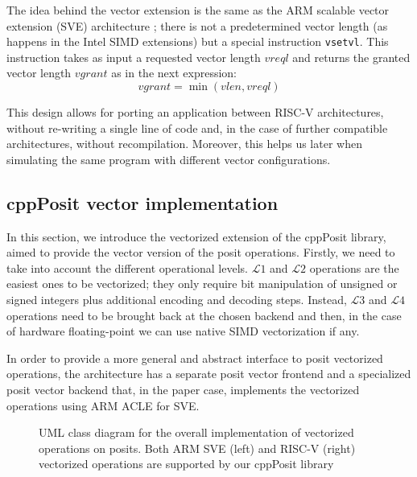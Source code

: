 The idea behind the vector extension is the same as the ARM scalable vector extension (SVE) architecture \cite{armintr}; there is not a predetermined vector length (as happens in the Intel SIMD extensions) but a special instruction \texttt{vsetvl}. This instruction takes as input a requested vector length $vreql$ and returns the granted vector length $vgrant$ as in the next expression:
\begin{equation*} %
    vgrant = \min\left(vlen,vreql\right)
\end{equation*}

This design allows for porting an application between RISC-V architectures, without re-writing a single line of code and, in the case of further compatible architectures, without recompilation. Moreover, this helps us later when simulating the same program with different vector configurations.

\subsection{cppPosit vector implementation}

In this section, we introduce the vectorized extension of the cppPosit library, aimed to provide the vector version of the posit operations. Firstly, we need to take into account the  different operational levels. $\mathcal{L}1$ and $\mathcal{L}2$ operations are the easiest ones to be vectorized; they only require bit manipulation of unsigned or signed integers plus additional encoding and decoding steps. Instead, $\mathcal{L}3$ and $\mathcal{L}4$ operations need to be brought back at the chosen backend and then, in the case of hardware floating-point we can use native SIMD vectorization if any.

In order to provide a more general and abstract interface to posit vectorized operations, the architecture has a separate posit vector frontend and a specialized posit vector backend that, in the paper case, implements the vectorized operations using ARM ACLE for SVE.

\begin{figure}
\centering
{}

\caption{UML class diagram for the overall implementation of vectorized operations on posits. Both ARM SVE (left) and RISC-V (right) vectorized operations are supported by our cppPosit library}
\label{fig:cppPositvect}
\end{figure}

